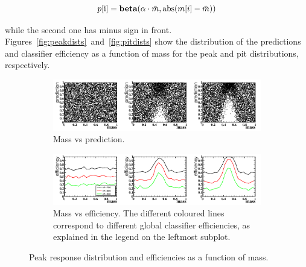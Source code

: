 \[
	p\text{[i]}=\textbf{beta}(\alpha \cdot \bar m, \text{abs}(m\text[i]-\bar m))
\]

while the second one has minus sign in front. Figures~\ref{fig:peakdists}~and~\ref{fig:pitdists} show the distribution of the predictions
and classifier efficiency as a function of mass for the peak and pit distributions, respectively. 
\begin{figure}[H]
\label{fig:peakdists}
\centering
		\begin{subfigure}[b]{0.95\textwidth}
			\includegraphics[width=\textwidth]{graphs/PeakDistributions.png}
			\caption{Mass vs prediction.}
		\end{subfigure}
		\begin{subfigure}[b]{0.95\textwidth}
			\includegraphics[width=\textwidth]{graphs/PeakEffs.png}
			\caption{Mass vs efficiency. The different coloured lines correspond to
different global classifier efficiencies, as explained in the legend on the leftmost subplot.}
		\end{subfigure}
		\caption{Peak response distribution and efficiencies as a function of mass. }
\end{figure}

